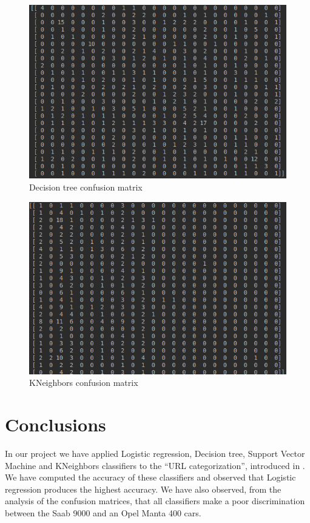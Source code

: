 \documentclass{article} %
\begin{document}
\begin{figure}
	\includegraphics[width=\linewidth]{dc_confusion.png}
	\caption{Decision tree confusion matrix}
	\label{fig:dc_confusion.png}
\end{figure}

\begin{figure}
	\includegraphics[width=\linewidth]{knb_confusion.png}
	\caption{KNeighbors confusion matrix}
	\label{fig:knb_confusion.png}
\end{figure}


\section{Conclusions}
  In our project we have applied  Logistic regression, Decision tree, Support Vector Machine and KNeighbors classifiers  to the ``URL categorization'', introduced in \cite{url_class}. We have computed the accuracy of these classifiers and observed that Logistic regression produces the highest accuracy. We have also observed, from the analysis of the confusion matrices, that all classifiers make a poor discrimination between the Saab 9000 and an Opel Manta 400 cars. 


 
 
\end{document}
